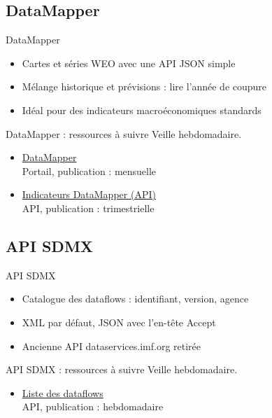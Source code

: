\documentclass[aspectratio=169,11pt]{beamer}
\begin{document}
\subsection{DataMapper}
\begin{frame}{DataMapper}
\begin{itemize}
\item Cartes et séries WEO avec une API JSON simple
\item Mélange historique et prévisions : lire l'année de coupure
\item Idéal pour des indicateurs macroéconomiques standards
\end{itemize}
\end{frame}

\begin{frame}{DataMapper : ressources à suivre}
\small
Veille hebdomadaire.
\begin{itemize}
\item \href{https://www.imf.org/external/datamapper}{DataMapper}\\{\footnotesize Portail, publication : mensuelle}
\item \href{https://www.imf.org/external/datamapper/api/v1/indicators}{Indicateurs DataMapper (API)}\\{\footnotesize API, publication : trimestrielle}
\end{itemize}
\end{frame}

\subsection{API SDMX}
\begin{frame}{API SDMX}
\begin{itemize}
\item Catalogue des dataflows : identifiant, version, agence
\item XML par défaut, JSON avec l'en-tête Accept
\item Ancienne API dataservices.imf.org retirée
\end{itemize}
\end{frame}

\begin{frame}{API SDMX : ressources à suivre}
\small
Veille hebdomadaire.
\begin{itemize}
\item \href{https://api.imf.org/external/sdmx/2.1/dataflow}{Liste des dataflows}\\{\footnotesize API, publication : hebdomadaire}
\end{itemize}
\end{frame}
\end{document}
